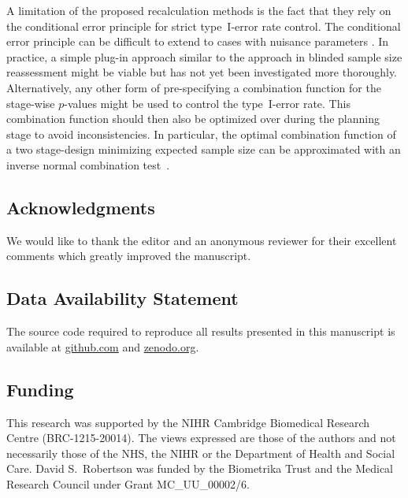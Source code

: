 \documentclass[12pt]{article}
\begin{document}
A limitation of the proposed recalculation methods is the fact that they
rely on the conditional error principle for strict type~I-error rate control.
The conditional error principle can be difficult to extend to cases with nuisance
parameters \cite{gutjahr2011}.
In practice, a simple plug-in approach similar to the approach in blinded sample size reassessment might be viable but has not yet been investigated more thoroughly.
Alternatively, any other form of pre-specifying a combination function for the stage-wise $p$-values might be used to control the type~I-error rate.
This combination function should then also be optimized over during the planning stage
to avoid inconsistencies.
In particular, the optimal combination function of a two stage-design minimizing expected sample size can be approximated with an inverse normal combination test~\cite{pilz2019}.

\subsection*{Acknowledgments}

We would like to thank the editor and an anonymous reviewer for their excellent comments which greatly improved the manuscript.

\subsection*{Data Availability Statement}

The source code required to reproduce all results presented in this manuscript is available at
\href{https://github.com/kkmann/unblinded-sample-size-adaptation}{github.com}
and
\href{https://doi.org/10.5281/zenodo.3925752}{zenodo.org}.

\subsection*{Funding}

This research was supported by the NIHR Cambridge Biomedical Research Centre (BRC-1215-20014). The views expressed are those of the authors and not necessarily those of the NHS, the NIHR or the Department of Health and Social Care. David S.\ Robertson was funded by the Biometrika Trust and the Medical Research Council under Grant MC\_UU\_00002/6.



\end{document}

